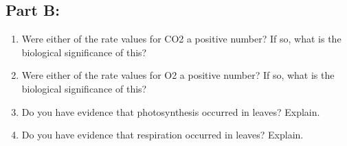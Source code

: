 \documentclass[a4paper, 12pt, english]{article}
\begin{document}
\subsection{Part B:}

\begin{enumerate}
	\item Were either of the rate values for CO2 a positive number? If so, what is the
	      biological significance of this?
	\item Were either of the rate values for O2 a positive number? If so, what is the
	      biological significance of this?
	\item Do you have evidence that photosynthesis occurred in leaves? Explain.
	\item Do you have evidence that respiration occurred in leaves? Explain.
\end{enumerate}
\end{document}
